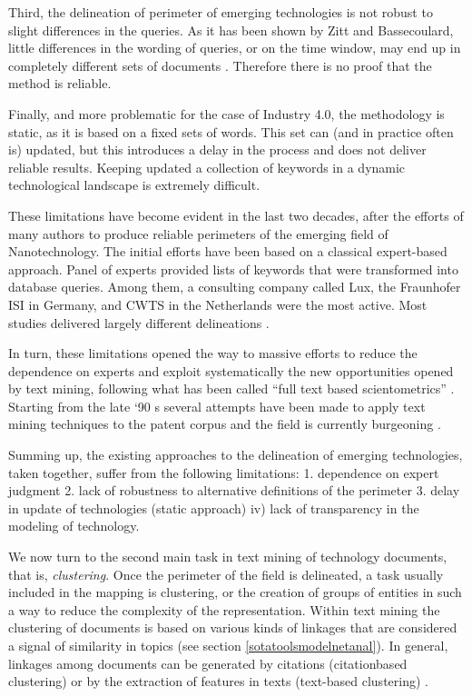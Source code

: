 \documentclass[b5paper,]{book}
\theoremstyle{definition}
\theoremstyle{definition}
\theoremstyle{definition}
\theoremstyle{remark}
\begin{document}
Third, the delineation of perimeter of emerging technologies is not
robust to slight differences in the queries. As it has been shown by
Zitt and Bassecoulard, little differences in the wording of queries, or
on the time window, may end up in completely different sets of documents
\citep{zitt2006delineating}. Therefore there is no proof that the method
is reliable.

Finally, and more problematic for the case of Industry 4.0, the
methodology is static, as it is based on a fixed sets of words. This set
can (and in practice often is) updated, but this introduces a delay in
the process and does not deliver reliable results. Keeping updated a
collection of keywords in a dynamic technological landscape is extremely
difficult.

These limitations have become evident in the last two decades, after the
efforts of many authors to produce reliable perimeters of the emerging
field of Nanotechnology. The initial efforts have been based on a
classical expert-based approach. Panel of experts provided lists of
keywords that were transformed into database queries. Among them, a
consulting company called Lux, the Fraunhofer ISI in Germany, and CWTS
in the Netherlands were the most active. Most studies delivered largely
different delineations
\citep{youtie2008nanotechnology, ghazinoory2013application, ozcan2017patent}.

In turn, these limitations opened the way to massive efforts to reduce
the dependence on experts and exploit systematically the new
opportunities opened by text mining, following what has been called
``full text based scientometrics'' \citep{boyack2013improving}. Starting
from the late `90 s several attempts have been made to apply text mining
techniques to the patent corpus and the field is currently burgeoning
\citep{joung2017monitoring, ozcan2017patent}.

Summing up, the existing approaches to the delineation of emerging
technologies, taken together, suffer from the following limitations: 1.
dependence on expert judgment 2. lack of robustness to alternative
definitions of the perimeter 3. delay in update of technologies (static
approach) iv) lack of transparency in the modeling of technology.

We now turn to the second main task in text mining of technology
documents, that is, \emph{clustering}. Once the perimeter of the field
is delineated, a task usually included in the mapping is clustering, or
the creation of groups of entities in such a way to reduce the
complexity of the representation. Within text mining the clustering of
documents is based on various kinds of linkages that are considered a
signal of similarity in topics (see section
\ref{sotatoolsmodelnetanal}). In general, linkages among documents can
be generated by citations (citationbased clustering) or by the
extraction of features in texts (text-based clustering)
\citep{leydesdorff2006measuring, wang2017clustering, jaffe1993geographic}.
\end{document}
